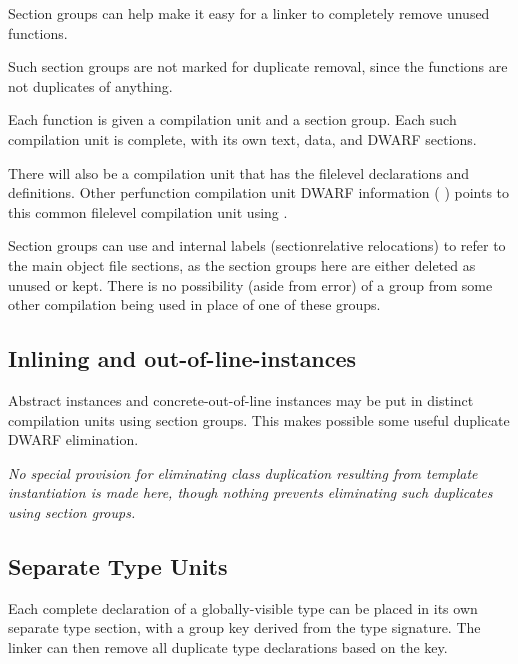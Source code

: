 Section groups can help make it easy for a linker to completely
remove unused functions.

Such section groups are not marked for duplicate removal,
since the functions are not duplicates of anything.

Each function is given a compilation unit and a section
group. Each such compilation unit is complete, with its own
text, data, and DWARF sections.

There will also be a compilation unit that has the file\dash level
declarations and definitions. Other per\dash function compilation
unit DWARF information (
) points to this common
file\dash level compilation unit using .

Section groups can use  and internal labels
(section\dash relative relocations) to refer to the main object
file sections, as the section groups here are either deleted
as unused or kept. There is no possibility (aside from error)
of a group from some other compilation being used in place
of one of these groups.


\subsection{Inlining and out-of-line-instances}
\label{app:inliningandoutoflineinstances}

Abstract instances
and concrete-out-of-line instances may be
put in distinct compilation units using section groups. This
makes possible some useful duplicate DWARF elimination.

\textit{No special provision for eliminating class duplication
resulting from template instantiation is made here, though
nothing prevents eliminating such duplicates using section
groups.}


\subsection{Separate Type Units}
\label{app:separatetypeunits}

Each complete declaration of a globally-visible type can be
placed in its own separate type section, with a group key
derived from the type signature. The linker can then remove
all duplicate type declarations based on the key.

